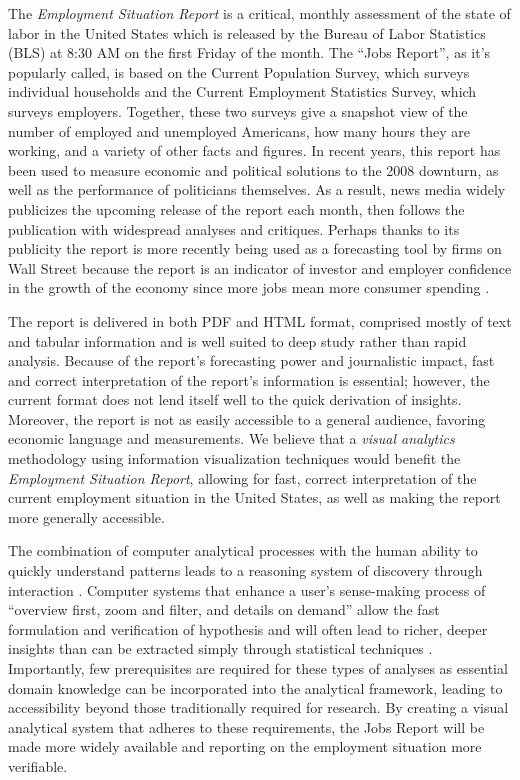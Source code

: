 \documentclass[journal]{IEEEtran}
\newcommand\Ben[1]{{\color{blue}#1}}		%
\begin{document}
\Ben{The \textit{Employment Situation Report} is a critical, monthly assessment of the state of labor in the United States which is released by the Bureau of Labor Statistics (BLS) at 8:30 AM on the first Friday of the month. The ``Jobs Report'', as it's popularly called, is based on the Current Population Survey, which surveys individual households and the Current Employment Statistics Survey, which surveys employers. Together, these two surveys give a snapshot view of the number of employed and unemployed Americans, how many hours they are working, and a variety of other facts and figures. In recent years, this report has been used to measure economic and political solutions to the 2008 downturn, as well as the performance of politicians themselves. As a result, news media widely publicizes the upcoming release of the report each month, then follows the publication with widespread analyses and critiques. Perhaps thanks to its publicity the report is more recently being used as a forecasting tool by firms on Wall Street because the report is an indicator of investor and employer confidence in the growth of the economy since more jobs mean more consumer spending \cite{mahorney_what_2013}.

The report is delivered in both PDF and HTML format, comprised mostly of text and tabular information and is well suited to deep study rather than rapid analysis. Because of the report's forecasting power and journalistic impact, fast and correct interpretation of the report's information is essential; however, the current format does not lend itself well to the quick derivation of insights. Moreover, the report is not as easily accessible to a general audience, favoring economic language and measurements. We believe that a \textit{visual analytics} methodology \cite{keim_mastering_2010} using information visualization techniques would benefit the \textit{Employment Situation Report}, allowing for fast, correct interpretation of the current employment situation in the United States, as well as making the report more generally accessible.

The combination of computer analytical processes with the human ability to quickly understand patterns leads to a reasoning system of discovery through interaction \cite{green_visual_2008}. Computer systems that enhance a user's sense-making process of ``overview first, zoom and filter, and details on demand'' allow the fast formulation and verification of hypothesis and will often lead to richer, deeper insights than can be extracted simply through statistical techniques \cite{heer_interactive_2012}. Importantly, few prerequisites are required for these types of analyses as essential domain knowledge can be incorporated into the analytical framework, leading to accessibility beyond those traditionally required for research. By creating a visual analytical system that adheres to these requirements, the Jobs Report will be made more widely available and reporting on the employment situation more verifiable.}
\end{document}
